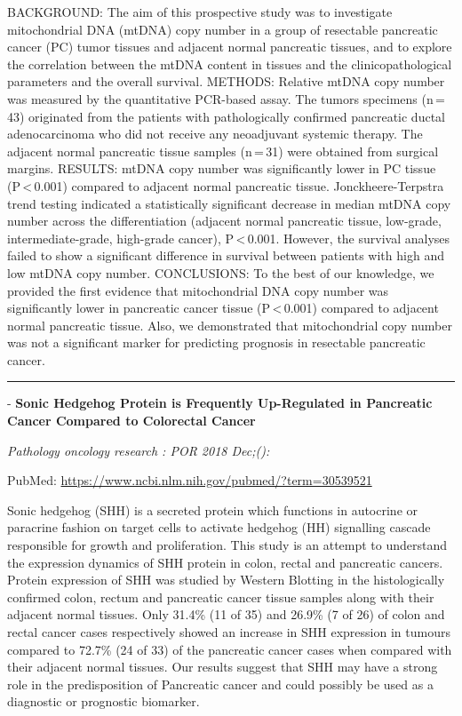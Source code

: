 \documentclass[]{article}
\begin{document}
BACKGROUND: The aim of this prospective study was to investigate
mitochondrial DNA (mtDNA) copy number in a group of resectable
pancreatic cancer (PC) tumor tissues and adjacent normal pancreatic
tissues, and to explore the correlation between the mtDNA content in
tissues and the clinicopathological parameters and the overall survival.
METHODS: Relative mtDNA copy number was measured by the quantitative
PCR-based assay. The tumors specimens (n\,=\,43) originated from the
patients with pathologically confirmed pancreatic ductal adenocarcinoma
who did not receive any neoadjuvant systemic therapy. The adjacent
normal pancreatic tissue samples (n\,=\,31) were obtained from surgical
margins. RESULTS: mtDNA copy number was significantly lower in PC tissue
(P\,\textless{}\,0.001) compared to adjacent normal pancreatic tissue.
Jonckheere-Terpstra trend testing indicated a statistically significant
decrease in median mtDNA copy number across the differentiation
(adjacent normal pancreatic tissue, low-grade, intermediate-grade,
high-grade cancer), P\,\textless{}\,0.001. However, the survival
analyses failed to show a significant difference in survival between
patients with high and low mtDNA copy number. CONCLUSIONS: To the best
of our knowledge, we provided the first evidence that mitochondrial DNA
copy number was significantly lower in pancreatic cancer tissue
(P\,\textless{}\,0.001) compared to adjacent normal pancreatic tissue.
Also, we demonstrated that mitochondrial copy number was not a
significant marker for predicting prognosis in resectable pancreatic
cancer.

{}

{}

\begin{center}\rule{0.5\linewidth}{\linethickness}\end{center}

 - \textbf{Sonic Hedgehog Protein is Frequently Up-Regulated in
Pancreatic Cancer Compared to Colorectal Cancer}

\emph{Pathology oncology research : POR 2018 Dec;():}

PubMed: \url{https://www.ncbi.nlm.nih.gov/pubmed/?term=30539521}

Sonic hedgehog (SHH) is a secreted protein which functions in autocrine
or paracrine fashion on target cells to activate hedgehog (HH)
signalling cascade responsible for growth and proliferation. This study
is an attempt to understand the expression dynamics of SHH protein in
colon, rectal and pancreatic cancers. Protein expression of SHH was
studied by Western Blotting in the histologically confirmed colon,
rectum and pancreatic cancer tissue samples along with their adjacent
normal tissues. Only 31.4\% (11 of 35) and 26.9\% (7 of 26) of colon and
rectal cancer cases respectively showed an increase in SHH expression in
tumours compared to 72.7\% (24 of 33) of the pancreatic cancer cases
when compared with their adjacent normal tissues. Our results suggest
that SHH may have a strong role in the predisposition of Pancreatic
cancer and could possibly be used as a diagnostic or prognostic
biomarker.
\end{document}
